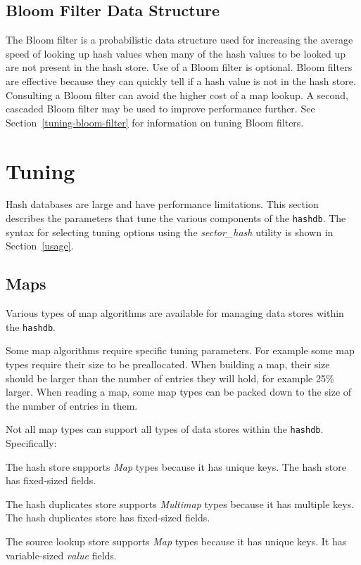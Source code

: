 \documentclass[10pt,twoside]{article}
\newcommand{\sh}{\emph{sector\_hash}\xspace}
\newcommand{\hdb}{\texttt{hashdb}\xspace}
\begin{document}
\subsection{Bloom Filter Data Structure}
The Bloom filter is a probabilistic data structure used
for increasing the average speed of looking up hash values
when many of the hash values to be looked up are not present in the hash store.
Use of a Bloom filter is optional.
Bloom filters are effective because they can quickly tell if a hash value is not in the hash store.
Consulting a Bloom filter can avoid the higher cost of a map lookup.
A second, cascaded Bloom filter may be used to improve performance further.
See Section~\ref{tuning-bloom-filter} for information on tuning Bloom filters.

\section{Tuning\label{tuning}}
Hash databases are large and have performance limitations.
This section describes the parameters that tune the various components of the \hdb.
The syntax for selecting tuning options using the \sh utility is shown in Section~\ref{usage}.

\subsection{Maps\label{tuning-map-type}}
Various types of map algorithms are available
for managing data stores within the \hdb.

Some map algorithms require specific tuning parameters.
For example some map types require their size to be preallocated.
When building a map, their size should be larger than the number of entries they will hold,
for example 25\% larger.
When reading a map, some map types can be packed down to the size of the number of entries in them.

Not all map types can support all types of data stores within the \hdb.
Specifically:
\begin{compactitem}
\item The hash store supports \emph{Map} types because it has unique keys.
The hash store has fixed-sized fields.
\item The hash duplicates store supports \emph{Multimap} types because it has multiple keys.
The hash duplicates store has fixed-sized fields.
\item The source lookup store supports \emph{Map} types because it has unique keys.
It has variable-sized \emph{value} fields.
\end{compactitem}
\end{document}
